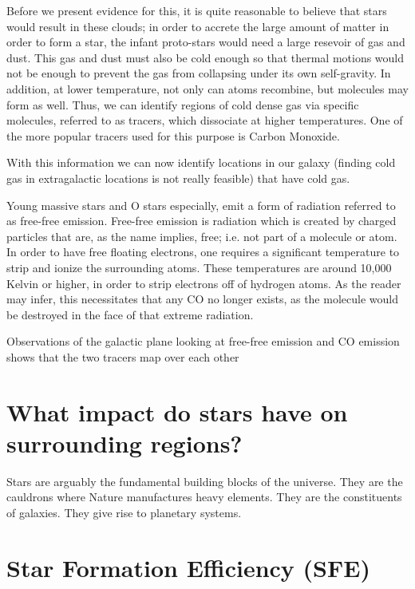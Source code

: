 \documentclass[../dissertation.tex]{subfiles}
\begin{document}
Before we present evidence for this, it is quite reasonable to believe that stars would result in these clouds; 
in order to accrete the large amount of matter in order to form a star, 
the infant proto-stars would need a large resevoir of gas and dust. 
This gas and dust must also be cold enough so that thermal motions would not be enough to prevent the gas from collapsing under its own self-gravity. 
In addition, at lower temperature, not only can atoms recombine, but molecules may form as well. 
Thus, we can identify regions of cold dense gas via specific molecules, referred to as tracers, which dissociate at higher temperatures. 
One of the more popular tracers used for this purpose is Carbon Monoxide. 

With this information we can now identify locations in our galaxy (finding cold gas in extragalactic locations is not really feasible)
that have cold gas.

Young massive stars and O stars especially, emit a form of radiation referred to as free-free emission. 
Free-free emission is radiation which is created by charged particles that are, as the name implies, free; i.e. not part of a molecule or atom. 
In order to have free floating electrons, one requires a significant temperature to strip and ionize the surrounding atoms. 
These temperatures are around 10,000 Kelvin or higher, in order to strip electrons off of hydrogen atoms.
As the reader may infer, this necessitates that any CO no longer exists, as the molecule would be destroyed in the face of that extreme radiation. 

Observations of the galactic plane looking at free-free emission and CO emission shows that the two tracers map over each other

\section{What impact do stars have on surrounding regions?}

Stars are arguably the fundamental building blocks of the universe. They are the cauldrons where Nature manufactures heavy elements. They are the constituents of galaxies. They give rise to planetary systems. 

\section{Star Formation Efficiency (SFE)}
\end{document}
